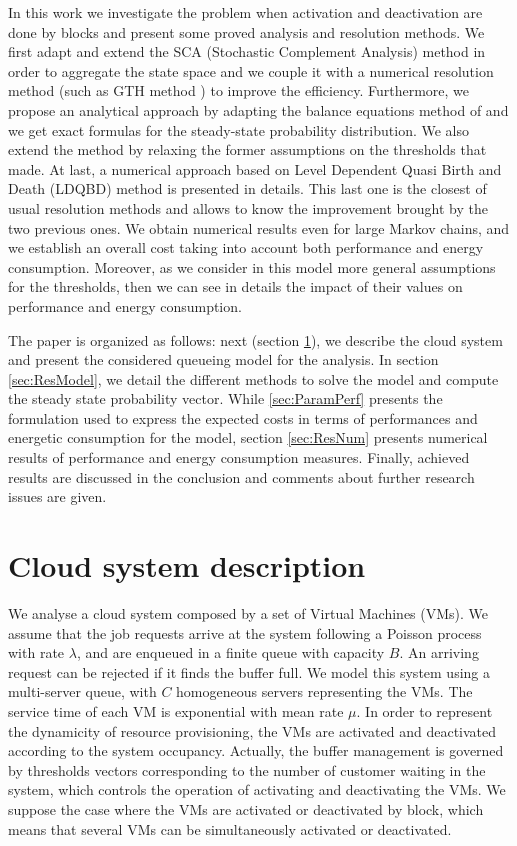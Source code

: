 \documentclass[conference]{IEEEtran}
\begin{document}
In this work we investigate the problem when activation and deactivation are done by blocks and present some proved analysis and resolution methods.
We first adapt and extend the SCA (Stochastic Complement Analysis) method in order to aggregate
the state space and we couple it with a numerical resolution method (such as GTH method \cite{Stew95}) to improve the efficiency.
Furthermore, we propose an analytical approach by  adapting the balance equations method of \cite{le2000simple} and we get exact formulas 
for the steady-state probability distribution.
We also extend the method by relaxing the former assumptions on the thresholds that \cite{le2000simple} made. 
At last, a numerical approach based on Level Dependent Quasi Birth and Death (LDQBD) method is presented in details. 
This last one is the closest of usual resolution methods
and allows to know the improvement brought by the two previous ones. We obtain numerical results even for large Markov chains,
and we establish an overall cost taking into account both performance and energy consumption. Moreover, as we consider 
in this model more general assumptions for the thresholds, then  we can  see in details the impact of their  values 
on performance and energy consumption.  


The paper is organized as follows: next (section \ref{sec:ModelDet}), we describe the cloud system and present the considered queueing model
for the analysis. In section \ref{sec:ResModel}, we detail the different methods to solve the model and compute the steady state probability vector.
While \ref{sec:ParamPerf} presents the formulation used to express the expected costs
in terms of performances and energetic consumption for the model,
section \ref{sec:ResNum} presents numerical results of  performance and energy consumption measures. Finally, 
achieved results are discussed in the conclusion and comments about further research issues  are given.


\section{Cloud system description} \label{sec:ModelDet}

We analyse  a cloud system composed by a set of Virtual Machines (VMs). We assume that the job requests arrive at the system
following a Poisson process with rate $\lambda$, and are enqueued in a finite queue with capacity $B$. An arriving request can be rejected if
it finds the buffer full.
We model this system  using a multi-server queue,  with $C$ homogeneous servers representing the VMs. The service time of each VM  is exponential
with mean rate $\mu$. In order to represent the dynamicity of resource provisioning, the VMs are activated and deactivated according to the system
occupancy. Actually, the buffer management is governed by thresholds vectors corresponding to the number of customer waiting in the system, which
controls the operation of activating and deactivating the VMs. We suppose the case where the VMs are activated or deactivated by block, which means
that several VMs can be simultaneously activated or deactivated.
\end{document}
